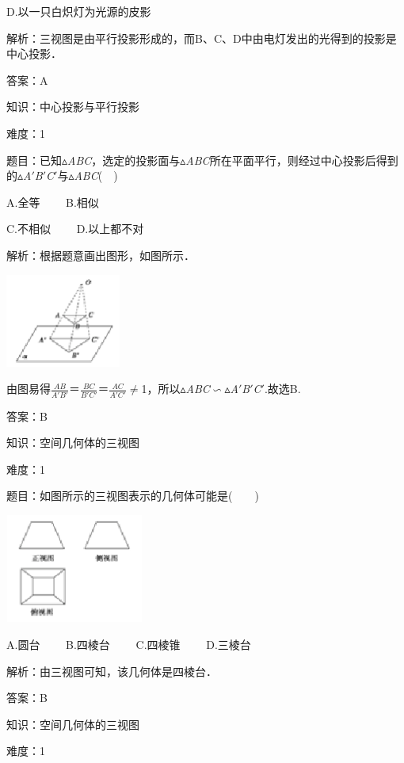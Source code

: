 \documentclass{article} %
\begin{document}
D.以一只白炽灯为光源的皮影

解析：三视图是由平行投影形成的，而B、C、D中由电灯发出的光得到的投影是中心投影．

答案：A


知识：中心投影与平行投影

难度：1

题目：已知$\mathrm{\vartriangle}$\textit{ABC}，选定的投影面与$\mathrm{\vartriangle}$\textit{ABC}所在平面平行，则经过中心投影后得到的$\mathrm{\vartriangle}$\textit{A}$'$\textit{B}$'$\textit{C}$'$与$\mathrm{\vartriangle}$\textit{ABC}(　)

A.全等　　  B.相似

C.不相似　　  D.以上都不对

解析：根据题意画出图形，如图所示．

\includegraphics*[width=1.49in, height=1.21in, keepaspectratio=false]{image28}

由图易得$\frac{AB}{A'B'}$＝$\frac{BC}{B'C'}$＝$\frac{AC}{A'C'}\mathrm{\neq}$1，所以$\mathrm{\vartriangle}$\textit{ABC}$\mathrm{\backsim}$$\mathrm{\vartriangle}$\textit{A}$'$\textit{B}$'$\textit{C}$'$.故选B.

答案：B

知识：空间几何体的三视图

难度：1

题目：如图所示的三视图表示的几何体可能是(　　)

\includegraphics*[width=1.79in, height=1.41in, keepaspectratio=false]{image29}

A.圆台　　 B.四棱台　　 C.四棱锥　　 D.三棱台

解析：由三视图可知，该几何体是四棱台．

答案：B

知识：空间几何体的三视图

难度：1
\end{document}
